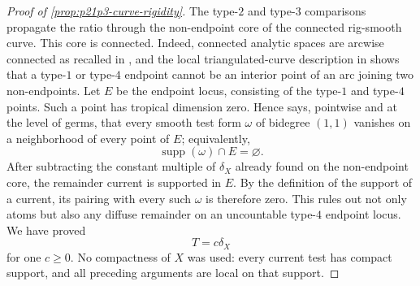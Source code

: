 \begin{proof}[Proof of \cref{prop:p21p3-curve-rigidity}]
The type-$2$ and type-$3$ comparisons propagate the ratio through the
non-endpoint core of the connected rig-smooth curve.  This core is
connected.  Indeed, connected analytic spaces are arcwise connected as
recalled in \cite[\S12.1.12]{CLD25}, and the local triangulated-curve
description in \cite[\S\S18.2.5--18.2.8]{CLD25} shows that a type-$1$ or
type-$4$ endpoint cannot be an interior point of an arc joining two
non-endpoints.  Let \(E\) be the
endpoint locus, consisting of the type-$1$ and type-$4$ points.  Such a
point has tropical dimension zero.  Hence
\cite[Proposition~3.3.6]{CLD25} says, pointwise and at the level of
germs, that every smooth test form \(\omega\) of bidegree \((1,1)\)
vanishes on a neighborhood of every point of \(E\); equivalently,
\[
                         \operatorname{supp}(\omega)\cap E=\varnothing .
\]
After subtracting the constant multiple of \(\delta_X\) already found
on the non-endpoint core, the remainder current is supported in \(E\).
By the definition of the support of a current, its pairing with every
such \(\omega\) is therefore zero.  This rules out not only atoms but
also any diffuse remainder on an uncountable type-$4$ endpoint locus.
We have proved
\begin{equation}
\label{eq:p21p3-smooth-classification}
                              T=c\delta_X
\end{equation}
for one \(c\geq0\).  No compactness of \(X\) was used: every current test
has compact support, and all preceding arguments are local on that
support.


\end{proof}
